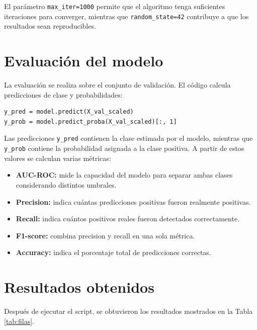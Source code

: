 \documentclass[12pt,letterpaper]{article}
\begin{document}
El parámetro \texttt{max\_iter=1000} permite que el algoritmo tenga suficientes iteraciones para converger, mientras que \texttt{random\_state=42} contribuye a que los resultados sean reproducibles.

\section{Evaluación del modelo}

La evaluación se realiza sobre el conjunto de validación. El código calcula predicciones de clase y probabilidades:

\begin{lstlisting}[style=pythonstyle, caption={Predicción en validación}]
y_pred = model.predict(X_val_scaled)
y_prob = model.predict_proba(X_val_scaled)[:, 1]
\end{lstlisting}

Las predicciones \texttt{y\_pred} contienen la clase estimada por el modelo, mientras que \texttt{y\_prob} contiene la probabilidad asignada a la clase positiva. A partir de estos valores se calculan varias métricas:

\begin{itemize}
    \item \textbf{AUC-ROC:} mide la capacidad del modelo para separar ambas clases considerando distintos umbrales.
    \item \textbf{Precision:} indica cuántas predicciones positivas fueron realmente positivas.
    \item \textbf{Recall:} indica cuántos positivos reales fueron detectados correctamente.
    \item \textbf{F1-score:} combina precision y recall en una sola métrica.
    \item \textbf{Accuracy:} indica el porcentaje total de predicciones correctas.
\end{itemize}

\section{Resultados obtenidos}

Después de ejecutar el script, se obtuvieron los resultados mostrados en la Tabla \ref{tab:filas}.
\end{document}

